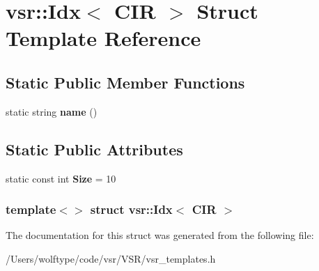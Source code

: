 \hypertarget{structvsr_1_1_idx_3_01_c_i_r_01_4}{\section{vsr\-:\-:Idx$<$ C\-I\-R $>$ Struct Template Reference}
\label{structvsr_1_1_idx_3_01_c_i_r_01_4}
}
\subsection*{Static Public Member Functions}
\begin{DoxyCompactItemize}
\item 
\hypertarget{structvsr_1_1_idx_3_01_c_i_r_01_4_a5f6c22e61196ba1111fdd2609da77da2}{static string {\bfseries name} ()}\label{structvsr_1_1_idx_3_01_c_i_r_01_4_a5f6c22e61196ba1111fdd2609da77da2}

\end{DoxyCompactItemize}
\subsection*{Static Public Attributes}
\begin{DoxyCompactItemize}
\item 
\hypertarget{structvsr_1_1_idx_3_01_c_i_r_01_4_aaf630d67ecb308a091e3c83fc604c1f8}{static const int {\bfseries Size} = 10}\label{structvsr_1_1_idx_3_01_c_i_r_01_4_aaf630d67ecb308a091e3c83fc604c1f8}

\end{DoxyCompactItemize}
\subsubsection*{template$<$$>$ struct vsr\-::\-Idx$<$ C\-I\-R $>$}



The documentation for this struct was generated from the following file\-:\begin{DoxyCompactItemize}
\item 
/\-Users/wolftype/code/vsr/\-V\-S\-R/vsr\-\_\-templates.\-h\end{DoxyCompactItemize}
